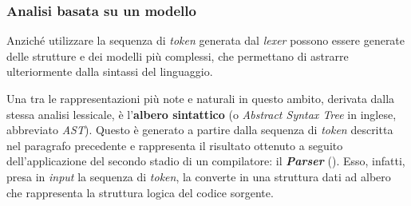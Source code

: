 \subsubsection{Analisi basata su un modello}
Anziché utilizzare la sequenza di \textit{token} generata dal \textit{lexer} possono essere generate delle strutture e dei modelli più complessi, che permettano di astrarre ulteriormente dalla sintassi del linguaggio.

Una tra le rappresentazioni più note e naturali in questo ambito, derivata dalla stessa analisi lessicale, è l'\textbf{albero sintattico} (o \textit{Abstract Syntax Tree} in inglese, abbreviato \textit{AST}).
%
Questo è generato a partire dalla sequenza di \textit{token} descritta nel paragrafo precedente e rappresenta il risultato ottenuto a seguito dell'applicazione del secondo stadio di un compilatore: il \textbf{\textit{Parser}} ().
%
Esso, infatti, presa in \textit{input} la sequenza di \textit{token}, la converte in una struttura dati ad albero che rappresenta la struttura logica del codice sorgente.

